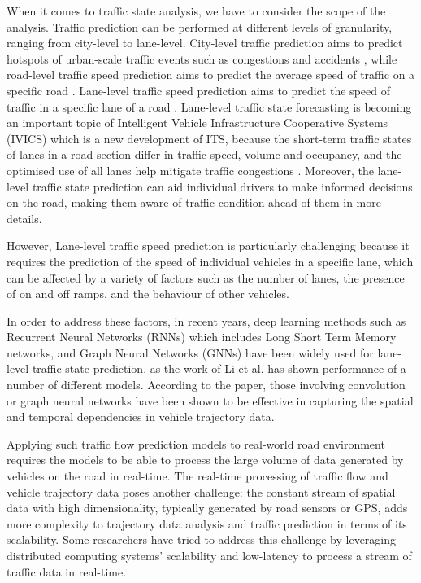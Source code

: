\documentclass[11pt]{uonthesis}
\begin{document}
When it comes to traffic state analysis, we have to consider the scope of the analysis. Traffic prediction can be performed at different levels of granularity, ranging from city-level to lane-level. City-level traffic prediction aims to predict hotspots of urban-scale traffic events such as congestions \cite{macnnimage} and accidents \cite{Zhou_Wang_Xie_Chen_Liu_2020}, while road-level traffic speed prediction aims to predict the average speed of traffic on a specific road \cite{Sigurdsson2018RoadTC}. Lane-level traffic speed prediction aims to predict the speed of traffic in a specific lane of a road \cite{gcn1}\cite{gcn}. Lane-level traffic state forecasting is becoming an important topic of Intelligent Vehicle Infrastructure Cooperative Systems (IVICS) which is a new development of ITS, because the short-term traffic states of lanes in a road section differ in traffic speed, volume and occupancy, and the optimised use of all lanes help mitigate traffic congestions \cite{GU20191}. Moreover, the lane-level traffic state prediction can aid individual drivers to make informed decisions on the road, making them aware of traffic condition ahead of them in more details.

However, Lane-level traffic speed prediction is particularly challenging because it requires the prediction of the speed of individual vehicles in a specific lane, which can be affected by a variety of factors such as the number of lanes, the presence of on and off ramps, and the behaviour of other vehicles.

In order to address these factors, in recent years, deep learning methods such as Recurrent Neural Networks (RNNs) which includes Long Short Term Memory networks, and Graph Neural Networks (GNNs) have been widely used for lane-level traffic state prediction, as the work of Li et al. \cite{li2024unifyinglaneleveltrafficprediction} has shown performance of a number of different models. According to the paper, those involving 
convolution or graph neural networks have been shown to be effective in capturing the spatial and temporal dependencies in vehicle trajectory data.

Applying such traffic flow prediction models to real-world road environment requires the models to be able to process the large volume of data generated by vehicles on the road in real-time. The real-time processing of traffic flow and vehicle trajectory data poses another challenge: the constant stream of spatial data with high dimensionality, typically generated by road sensors or GPS, adds more complexity to trajectory data analysis and traffic prediction in terms of its scalability. Some researchers \cite{9077707}\cite{Sigurdsson2018RoadTC}\cite{Yang2019} have tried to address this challenge by leveraging distributed computing systems' scalability and low-latency to process a stream of traffic data in real-time.
\end{document}
